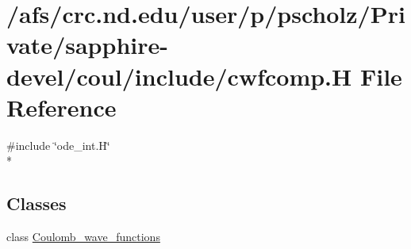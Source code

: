 \hypertarget{cwfcomp_8H}{\section{/afs/crc.nd.\-edu/user/p/pscholz/\-Private/sapphire-\/devel/coul/include/cwfcomp.H File Reference}
\label{cwfcomp_8H}
}
{\ttfamily \#include \char`\"{}ode\-\_\-int.\-H\char`\"{}}\\*
\subsection*{Classes}
\begin{DoxyCompactItemize}
\item 
class \hyperlink{classCoulomb__wave__functions}{Coulomb\-\_\-wave\-\_\-functions}
\end{DoxyCompactItemize}
